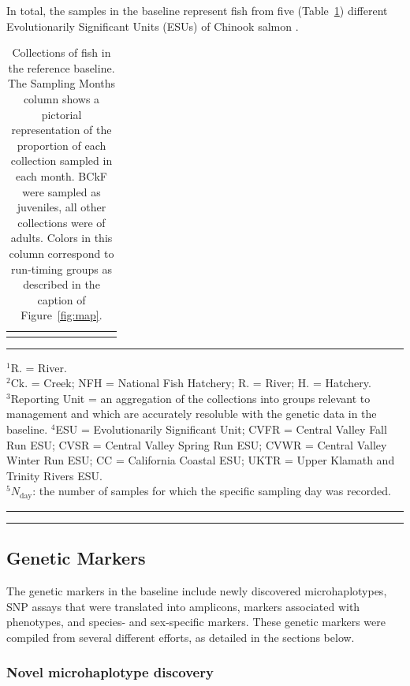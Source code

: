 In total, the samples in the baseline represent fish from five (Table~\ref{tab:samples}) different Evolutionarily Significant
Units (ESUs) of Chinook salmon \citep{waples1991pacific}.
\begin{table}
\caption{\footnotesize Collections of fish in the reference baseline.  The Sampling Months column shows
a pictorial representation of the proportion of each collection sampled in each month. BCkF were sampled as juveniles, all other collections were of adults. Colors in
this column correspond to run-timing groups as described in the caption of Figure~\protect\ref{fig:map}.}
\label{tab:samples}
{\small
\begin{tabular*}{\linewidth}{@{\extracolsep{\fill}} lllllllrcr}
\hline\hline
\vspace*{0.4ex}

\end{tabular*}
}
\rule{3cm}{0.3pt}

{\scriptsize
$^1$R. = River.\\
$^2$Ck. = Creek; NFH = National Fish Hatchery; R. = River; H. = Hatchery.\\
$^3$Reporting Unit = an aggregation of the collections into groups relevant to management and
which are accurately resoluble with the genetic data in the baseline.
$^4$ESU = Evolutionarily Significant Unit; CVFR = Central Valley Fall Run ESU; CVSR = Central Valley Spring Run ESU; CVWR =
Central Valley Winter Run ESU; CC = California Coastal ESU; UKTR = Upper Klamath and Trinity Rivers ESU. \\
$^5N_\mathrm{day}$: the number of samples for which the specific sampling day was recorded.
}
\hrule\vspace*{0.3ex}\hrule
\end{table}

\subsection*{Genetic Markers}

The genetic markers in the baseline include newly discovered microhaplotypes, SNP assays
that were translated into amplicons, markers associated with phenotypes, and
species- and sex-specific markers.
These genetic markers were compiled from several different
efforts, as detailed in the sections below.

\subsubsection*{Novel microhaplotype discovery}

